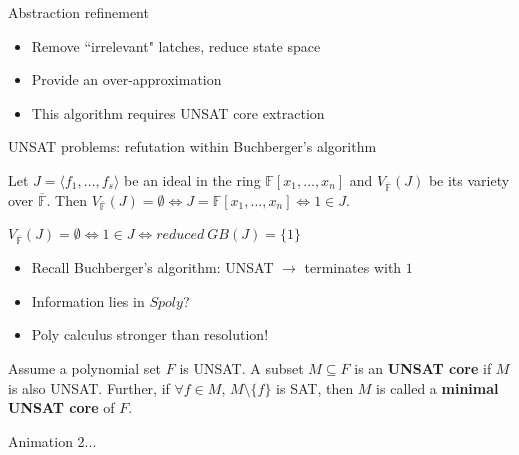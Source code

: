 \documentclass[xcolor=dvipsnames]{beamer}
\newcommand{\bi}{\begin{itemize}}
\newcommand{\ei}{\end{itemize}}
\newcommand{\F}{{\mathbb{F}}}
\begin{document}
\begin{frame}[label = refine]{\large{Abstraction refinement}}
\begin{figure}[hbt]
\end{figure}
\vspace{-0.2in}
\bi
\item Remove ``irrelevant" latches, reduce state space
\item Provide an over-approximation
\item This algorithm requires \alert{UNSAT core extraction}
\ei
\hyperlink{motiv3}{}
\end{frame}
\begin{frame}{\large{UNSAT problems: refutation within Buchberger's algorithm}}
\begin{Theorem}
Let $J = \langle f_1,\dots, f_s \rangle $ be
an ideal in the ring $ \mathbb{F}[x_1, \dots, x_n]$ and $V_{\overline{\F}}(J)$ be its
variety over $\overline{\F}$. Then $V_{\overline{\F}}(J) = \emptyset \iff J =
\mathbb{F}[x_1,\dots,x_n] \iff 1 \in J$.  
\end{Theorem}
$V_{\overline{\F}}(J)=\emptyset \iff 1\in J \iff reduced~GB(J) = \{1\}$
\bi
\item Recall Buchberger's algorithm: UNSAT $\to$ terminates with $1$
\pause
\item  Information lies in $Spoly$?
\item Poly calculus stronger than resolution!
\ei

\begin{Definition}
Assume a polynomial set $F$ is UNSAT. A subset $M \subseteq F$ is an {\bf UNSAT core} 
if $M$ is also UNSAT. Further, if $\forall f\in M$, $M\setminus\{f\}$ is SAT, then 
$M$ is called a {\bf minimal UNSAT core} of $F$.
\end{Definition}

Animation 2...
\end{frame}
\end{document}
